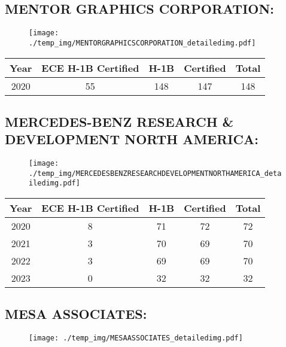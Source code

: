 \documentclass{article}%
\begin{document}
%
\newpage%
\subsection{MENTOR GRAPHICS CORPORATION:}%
\label{subsec:MENTORGRAPHICSCORPORATION}%
\label{MENTORGRAPHICSCORPORATIONdetailed}%


\begin{figure}[htbp]%
\centering%
\texttt{[image: ./temp\_img/MENTORGRAPHICSCORPORATION\_detailedimg.pdf]}%
\end{figure}

%
\begin{longtable}{c|c|c|c|c}%
\hline%
Year&ECE H{-}1B Certified&H{-}1B&Certified&Total\\%
\hline%
2020&55&148&147&148\\%
\hline%
\end{longtable}

%
\newpage%
\subsection{MERCEDES{-}BENZ RESEARCH \& DEVELOPMENT NORTH AMERICA:}%
\label{subsec:MERCEDES{-}BENZRESEARCHDEVELOPMENTNORTHAMERICA}%
\label{MERCEDESBENZRESEARCHDEVELOPMENTNORTHAMERICAdetailed}%


\begin{figure}[htbp]%
\centering%
\texttt{[image: ./temp\_img/MERCEDESBENZRESEARCHDEVELOPMENTNORTHAMERICA\_detailedimg.pdf]}%
\end{figure}

%
\begin{longtable}{c|c|c|c|c}%
\hline%
Year&ECE H{-}1B Certified&H{-}1B&Certified&Total\\%
\hline%
2020&8&71&72&72\\%
\hline%
2021&3&70&69&70\\%
\hline%
2022&3&69&69&70\\%
\hline%
2023&0&32&32&32\\%
\hline%
\end{longtable}

%
\newpage%
\subsection{MESA ASSOCIATES:}%
\label{subsec:MESAASSOCIATES}%
\label{MESAASSOCIATESdetailed}%


\begin{figure}[htbp]%
\centering%
\texttt{[image: ./temp\_img/MESAASSOCIATES\_detailedimg.pdf]}%
\end{figure}
\end{document}
